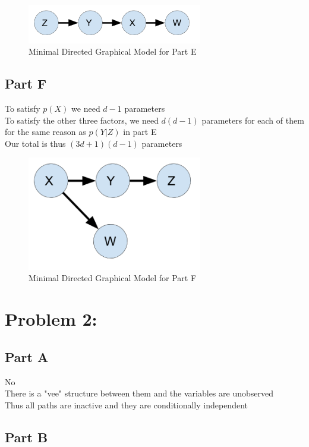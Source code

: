 \documentclass[twoside,11pt]{article}
\theoremstyle{definition}
\begin{document}
\begin{figure}[h]
\centering
\includegraphics[width=3in]{HW1_Prob1_partE.png}
\caption{Minimal Directed Graphical Model for Part E}
\end{figure}

\subsection*{Part F}

To satisfy $p(X)$ we need $d-1$ parameters\\
To satisfy the other three factors, we need $d(d-1)$ parameters for each of them for the same reason as $p(Y|Z)$ in part E\\
Our total is thus $(3d+1)(d-1)$ parameters

\begin{figure}[h]
\centering
\includegraphics[width=3in]{HW1_Prob1_partF.png}
\caption{Minimal Directed Graphical Model for Part F}
\end{figure}

\newpage

\section*{Problem 2:}

\subsection*{Part A}
No\\
There is a "vee" structure between them and the variables are unobserved\\
Thus all paths are inactive and they are conditionally independent\\

\subsection*{Part B}
\end{document}
